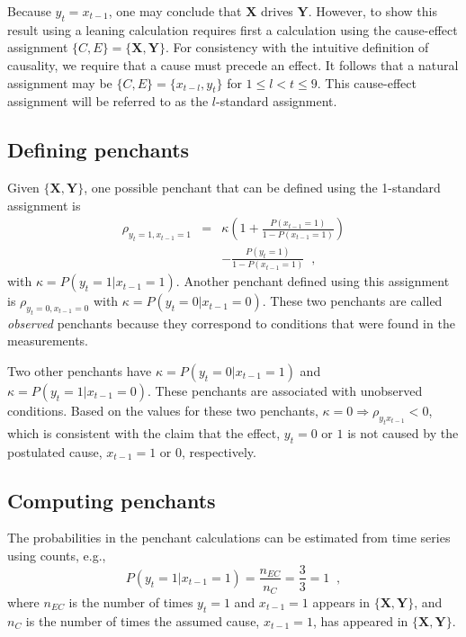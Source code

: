 \documentclass[twocolumn,aps,pre,groupedaddress]{revtex4-1}
\begin{document}
Because $y_t=x_{t-1}$, one may conclude that $\mathbf{X}$ drives $\mathbf{Y}$.  However, to show this result using a leaning calculation requires first a calculation using the cause-effect assignment $\{C,E\}=\{\mathbf{X},\mathbf{Y}\}$. For consistency with the intuitive definition of causality, we require that a cause must precede an effect.  It follows that a natural assignment may be $\{C,E\}=\{x_{t-l},y_t\}$ for $1 \leq l < t \leq 9$.  This cause-effect assignment will be referred to as the $l$-standard assignment.

\subsection{Defining penchants}
Given $\{\mathbf{X},\mathbf{Y}\}$, one possible penchant that can be defined using the 1-standard assignment is
\begin{eqnarray*}
\rho_{y_{t}=1,x_{t-1}=1} &=& \kappa \left(1+\frac{P\left(x_{t-1} = 1\right)}{1-P\left(x_{t-1} = 1\right)}\right)\\
& & -\frac{P\left(y_{t} = 1\right)}{1-P\left(x_{t-1} = 1\right)}\;\;,
\end{eqnarray*}
with $\kappa = P\left( y_t = 1 | x_{t-1} = 1\right)$.  Another penchant defined using this assignment is $\rho_{y_t=0,x_{t-1}=0}$ with  $\kappa = P\left( y_t = 0 | x_{t-1} = 0\right)$.  These two penchants are called {\em observed} penchants because they correspond to conditions that were found in the measurements.  

Two other penchants have $\kappa = P\left( y_t = 0 | x_{t-1} = 1\right)$ and $\kappa = P\left( y_t = 1 | x_{t-1} = 0\right)$.  These penchants are associated with unobserved conditions.  Based on the values for these two penchants, $\kappa=0\Rightarrow \rho_{y_{t}x_{t-1}} < 0$, which is consistent with the claim that the effect, $y_t = 0$ or $1$ is not caused by the postulated cause, $x_{t-1} = 1$ or $0$, respectively.  


\subsection{Computing penchants}
The probabilities in the penchant calculations can be estimated from time series using counts, e.g.,\
$$
P\left( y_t = 1 | x_{t-1} = 1\right) = \frac{n_{EC}}{n_C} = \frac{3}{3} = 1\;\;,
$$
where $n_{EC}$ is the number of times $y_t=1$ and $x_{t-1}=1$ appears in $\{\mathbf{X},\mathbf{Y}\}$, and $n_{C}$ is the number of times the assumed cause, $x_{t-1}=1$, has appeared in $\{\mathbf{X},\mathbf{Y}\}$.  
\end{document}

